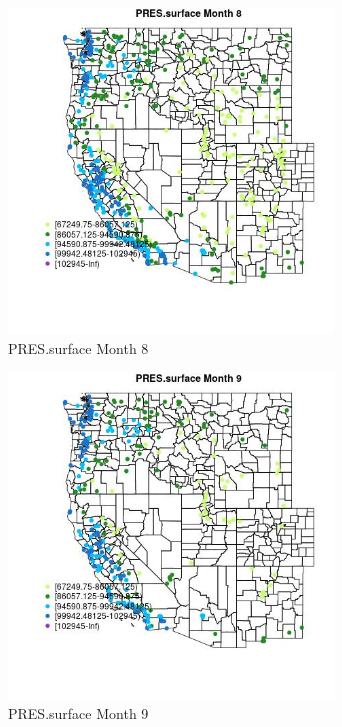 \begin{figure} 
\centering  
\includegraphics[width=0.77\textwidth]{Code_Outputs/Report_ML_input_PM25_Step4_part_e_de_duplicated_aves_compiled_2019-05-18wNAs_MapObsMo8PRESsurface.jpg} 
\caption{\label{fig:Report_ML_input_PM25_Step4_part_e_de_duplicated_aves_compiled_2019-05-18wNAsMapObsMo8PRESsurface}PRES.surface Month 8} 
\end{figure} 
 

\clearpage 

\begin{figure} 
\centering  
\includegraphics[width=0.77\textwidth]{Code_Outputs/Report_ML_input_PM25_Step4_part_e_de_duplicated_aves_compiled_2019-05-18wNAs_MapObsMo9PRESsurface.jpg} 
\caption{\label{fig:Report_ML_input_PM25_Step4_part_e_de_duplicated_aves_compiled_2019-05-18wNAsMapObsMo9PRESsurface}PRES.surface Month 9} 
\end{figure} 
 

